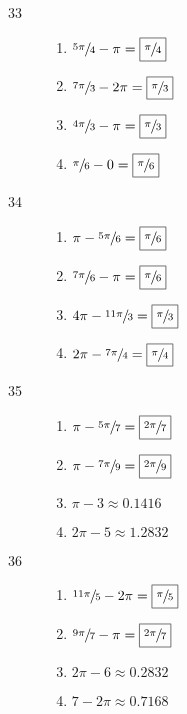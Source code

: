 \documentclass{exam}
\begin{document}
\begin{description}
      \item[33] 
        \begin{enumerate}[a]
          \item $\sfrac{5 \pi}{4} - \pi   = \boxed{ \sfrac{\pi}{4} }$
          \item $\sfrac{7 \pi}{3} - 2 \pi = \boxed{ \sfrac{\pi}{3} }$
          \item $\sfrac{4 \pi}{3} - \pi   = \boxed{ \sfrac{\pi}{3} }$
          \item $\sfrac{\pi}{6} - 0       = \boxed{ \sfrac{\pi}{6} }$
        \end{enumerate}
        
      \item[34] 
        \begin{enumerate}[a]
          \item $ \pi - \sfrac{5 \pi}{6}   = \boxed{ \sfrac{\pi}{6} }$
          \item $\sfrac{7 \pi}{6} - \pi    = \boxed{ \sfrac{\pi}{6} }$
          \item $4 \pi - \sfrac{11 \pi}{3} = \boxed{ \sfrac{\pi}{3} }$
          \item $2 \pi - \sfrac{7 \pi}{4}  = \boxed{ \sfrac{\pi}{4} }$
        \end{enumerate}
        
      \item[35] 
        \begin{enumerate}[a]
          \item $\pi - \sfrac{5 \pi}{7} = \boxed{ \sfrac{2 \pi}{7} }$
          \item $\pi - \sfrac{7 \pi}{9} = \boxed{ \sfrac{2 \pi}{9} }$
          \item $\pi - 3         \approx \boxed{ 0.1416 }$
          \item $2 \pi - 5       \approx \boxed{ 1.2832 }$
        \end{enumerate}

      \item[36] 
        \begin{enumerate}[a]
          \item $\sfrac{11 \pi}{5} - 2 \pi = \boxed{ \sfrac{\pi}{5} }$
          \item $\sfrac{9 \pi}{7} - \pi    = \boxed{ \sfrac{2 \pi}{7} }$
          \item $2 \pi - 6          \approx \boxed{ 0.2832 }$
          \item $7 - 2 \pi          \approx \boxed{ 0.7168 }$
        \end{enumerate}


\end{description}
\end{document}
